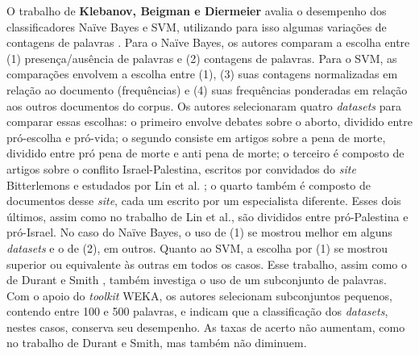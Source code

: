 O trabalho de \textbf{Klebanov, Beigman e Diermeier} avalia o desempenho dos classificadores Naïve Bayes e SVM, utilizando para isso algumas variações de contagens de palavras \cite{klebanov}. Para o Naïve Bayes, os autores comparam a escolha entre (1) presença/ausência de palavras e (2) contagens de palavras. Para o SVM, as comparações envolvem a escolha entre (1), (3) suas contagens normalizadas em relação ao documento (frequências) e (4) suas frequências ponderadas em relação aos outros documentos do corpus. Os autores selecionaram quatro \emph{datasets} para comparar essas escolhas: o primeiro envolve debates sobre o aborto, dividido entre pró-escolha e pró-vida; o segundo consiste em artigos sobre a pena de morte, dividido entre pró pena de morte e anti pena de morte; o terceiro é composto de artigos sobre o conflito Israel-Palestina, escritos por convidados do \emph{site} Bitterlemons e estudados por Lin et al. \cite{lin-et-al2006}; o quarto também é composto de documentos desse \emph{site}, cada um escrito por um especialista diferente. Esses dois últimos, assim como no trabalho de Lin et al., são divididos entre pró-Palestina e pró-Israel.  No caso do Naïve Bayes, o uso de (1) se mostrou melhor em alguns \emph{datasets} e o de (2), em outros. Quanto ao SVM, a escolha por (1) se mostrou superior ou equivalente às outras em todos os casos. Esse trabalho, assim como o de Durant e Smith \cite{durant-smith}, também investiga o uso de um subconjunto de palavras. Com o apoio do \emph{toolkit} WEKA, os autores selecionam subconjuntos pequenos, contendo entre 100 e 500 palavras, e indicam que a classificação dos \emph{datasets}, nestes casos, conserva seu desempenho. As taxas de acerto não aumentam, como no trabalho de Durant e Smith, mas também não diminuem.





